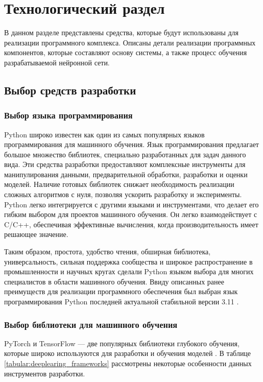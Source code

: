 \chapter{Технологический раздел}
\label{cha:impl}

В данном разделе представлены средства, которые будут использованы для реализации программного комплекса. Описаны детали реализации программных компонентов, которые составляют основу системы, а также процесс обучения разрабатываемой нейронной сети. 

\section{Выбор средств разработки}

\subsection{Выбор языка программирования}

Python широко известен как один из самых популярных языков программирования для машинного обучения. Язык программирования предлагает большое множество библиотек, специально разработанных для задач данного вида. Эти средства разработки предоставляют комплексные инструменты для манипулирования данными, предварительной обработки, разработки и оценки моделей. Наличие готовых библиотек снижает необходимость реализации сложных алгоритмов с нуля, позволяя ускорить разработку и эксперименты. Python легко интегрируется с другими языками и инструментами, что делает его гибким выбором для проектов машинного обучения. Он легко взаимодействует с C/C++, обеспечивая эффективные вычисления, когда производительность имеет решающее значение.

Таким образом, простота, удобство чтения, обширная библиотека, универсальность, сильная поддержка сообщества и широкое распространение в промышленности и научных кругах сделали Python языком выбора для многих специалистов в области машинного обучения. Ввиду описанных ранее преимуществ для реализации программного обеспечения был выбран язык программирования Python последней актуальной стабильной версии 3.11 \cite{python}.

\subsection{Выбор библиотеки для машинного обучения}

PyTorch и TensorFlow --- две популярных библиотеки глубокого обучения, которые широко используются для разработки и обучения моделей \cite{pytorch} \cite{tensorflow}. В таблице \ref{tabular:deeplearing_frameworks} рассмотрены некоторые особенности данных инструментов разработки. 

